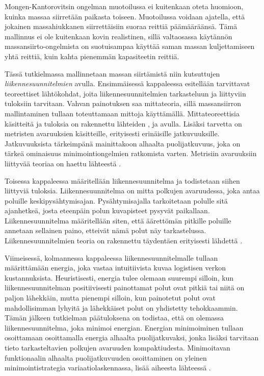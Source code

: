 \documentclass[12pt,oneside,a4paper]{amsbook} %
\begin{document}
Mongen-Kantorovitsin ongelman muotoilussa ei kuitenkaan oteta huomioon, kuinka massaa siirretään paikasta toiseen. Muotoilussa voidaan ajatella, että jokainen massahiukkanen siirrettäisiin suoraa reittiä päämääräänsä. Tämä mallinnus ei ole kuitenkaan kovin realistinen, sillä valtaosassa käytännön massansiirto-ongelmista on suotuisampaa käyttää saman massan kuljettamiseen yhtä reittiä, kuin kahta pienemmän kapasiteetin reittiä. 

Tässä tutkielmassa mallinnetaan massan siirtämistä niin kutsuttujen \textit{liikennesuunnitelmien} avulla. Ensimmäisessä kappaleessa esitellään tarvittavat teoreettiset lähtökohdat, joita liikennesuunnitelmien tarkasteluun ja liittyviin tuloksiin tarvitaan. Vahvan painotuksen saa mittateoria, sillä massansiirron mallintaminen tullaan toteuttamaan mittoja käyttämällä. Mittateoreettisia käsitteitä ja tuloksia on rakennettu lähteiden \cite{lehrbäck}, \cite{rudin} ja \cite{conway} avulla. Lisäksi tarvetta on metristen avaruuksien käsitteille, erityisesti erinäisille jatkuvuuksille. Jatkuvuuksista tärkeimpänä mainittakoon alhaalta puolijatkuvuus, joka on tärkeä ominaisuus minimointiongelmien ratkomista varten. Metrisiin avaruuksiin liittyvää teoriaa on haettu lähteestä \cite{rudin}.

Toisessa kappaleessa määritellään liikennesuunnitelma ja todistetaan siihen liittyviä tuloksia. Liikennesuunnitelma on mitta polkujen avaruudessa, joka antaa poluille keskipysähtymisajan. Pysähtymisajalla tarkoitetaan polulle sitä ajanhetkeä, josta eteenpäin polun kuvapisteet pysyvät paikallaan. Liikennesuunnitelma määritellään siten, että äärettömän pitkille poluille annetaan sellainen paino, etteivät nämä polut näy tarkastelussa. Liikennesuunnitelmien teoria on rakennettu täydentäen erityisesti lähdettä \cite{optimal}.

Viimeisessä, kolmannessa kappaleessa liikennesuunnitelmalle tullaan määrittämään energia, joka vastaa intuitiivista kuvaa logistisen verkon kustannuksista. Heuristisesti, energia tulee olemaan suurempi silloin, kun liikennesuunnitelman positiivisesti painottamat polut ovat pitkiä tai niitä on paljon lähekkäin, mutta pienempi silloin, kun painotetut polut ovat mahdollisimman lyhyitä ja lähekkäiset polut on yhdistetty tehokkaammin. Tämän jälkeen tutkielman päätuloksena on todistaa, että on olemassa liikennesuunnitelma, joka minimoi energian. Energian minimoiminen tullaan osoittamaan osoittamalla energia alhaalta puolijatkuvaksi, jonka lisäksi tarvitaan tieto tarkasteltavien polkujen avaruuden kompaktiudesta. Minimoitavan funktionaalin alhaalta puolijatkuvuuden osoittaminen on yleinen minimointistrategia variaatiolaskennassa, lisää aiheesta lähteessä \cite{benesova}.
\end{document}
